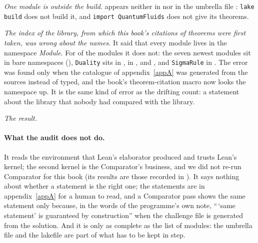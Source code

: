 \emph{One module is outside the build.}  appears neither in  nor in the umbrella file
: \texttt{lake build} does not build it, and \texttt{import QuantumFluids} does not give its theorems.

\emph{The index of the library, from which this book's citations of theorems were first taken, was wrong about the names.} It said that every module lives in
the namespace \emph{Module}. For \NxLibOddNs{} of the \NxLibModules{} modules it does not: the seven newest modules sit in bare namespaces
(), \texttt{Duality} sits in ,  in ,
and ,  and \texttt{SigmaRule} in . The error was found only when the
catalogue of appendix~\ref{appA} was generated from the sources instead of typed, and the book's theorem-citation macro now looks the namespace up.
It is the same kind of error as the drifting count: a statement about the library that nobody had compared with the library.

\emph{The result.}  

\paragraph{What the audit does not do.} It reads the environment that Lean's elaborator produced and trusts Lean's kernel; the second kernel is the
Comparator's business, and we did not re-run Comparator for this book (its results are those recorded in ). It says
nothing about whether a statement is the right one; the statements are in appendix~\ref{appA} for a human to read, and a Comparator pass shows the same statement only because, in the words of the programme's own note,
``\,`same statement' is guaranteed by construction'' when the challenge file is generated from the solution. And it is only
as complete as the list of modules: the umbrella file and the lakefile are part of what has to be kept in step.

